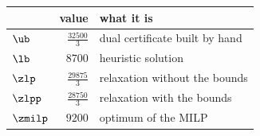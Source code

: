 \begin{center}\small
\begin{tabular}{lrl}
\toprule
 & value & what it is \\
\midrule
$\ub$ & $\frac{32500}{3}$ & dual certificate built by hand \\
$\lb$ & $8700$ & heuristic solution \\
$\zlp$ & $\frac{29875}{3}$ & relaxation without the bounds \\
$\zlpp$ & $\frac{28750}{3}$ & relaxation with the bounds \\
$\zmilp$ & $9200$ & optimum of the MILP \\
\bottomrule
\end{tabular}
\end{center}
